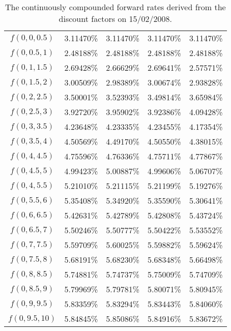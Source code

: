 \begin{landscape}
\begin{table}[ht]
\begin{center}
\begin{tabular}{c|c|c|c|c}
\toprule
$f(0,0,0.5)$ & 3.11470\% & 3.11470\% & 3.11470\% & 3.11470\% \\
$f(0,0.5,1)$ & 2.48188\% & 2.48188\% & 2.48188\% & 2.48188\% \\
$f(0,1,1.5)$ & 2.69428\% & 2.66629\% & 2.69641\% & 2.57571\% \\
$f(0,1.5,2)$ & 3.00509\% & 2.98389\% & 3.00674\% & 2.93828\% \\
$f(0,2,2.5)$ & 3.50001\% & 3.52393\% & 3.49814\% & 3.65984\% \\
$f(0,2.5,3)$ & 3.92720\% & 3.95902\% & 3.92386\% & 4.09428\% \\
$f(0,3,3.5)$ & 4.23648\% & 4.23335\% & 4.23455\% & 4.17354\% \\
$f(0,3.5,4)$ & 4.50569\% & 4.49170\% & 4.50550\% & 4.38015\% \\
$f(0,4,4.5)$ & 4.75596\% & 4.76336\% & 4.75711\% & 4.77867\% \\
$f(0,4.5,5)$ & 4.99423\% & 5.00887\% & 4.99606\% & 5.06707\% \\
$f(0,4,5.5)$ & 5.21010\% & 5.21115\% & 5.21199\% & 5.19276\% \\
$f(0,5.5,6)$ & 5.35408\% & 5.34920\% & 5.35590\% & 5.30641\% \\
$f(0,6,6.5)$ & 5.42631\% & 5.42789\% & 5.42808\% & 5.43724\% \\
$f(0,6.5,7)$ & 5.50246\% & 5.50777\% & 5.50422\% & 5.53552\% \\
$f(0,7,7.5)$ & 5.59709\% & 5.60025\% & 5.59882\% & 5.59624\% \\
$f(0,7.5,8)$ & 5.68191\% & 5.68230\% & 5.68348\% & 5.66498\% \\
$f(0,8,8.5)$ & 5.74881\% & 5.74737\% & 5.75009\% & 5.74709\% \\
$f(0,8.5,9)$ & 5.79969\% & 5.79781\% & 5.80071\% & 5.80945\% \\
$f(0,9,9.5)$ & 5.83359\% & 5.83294\% & 5.83443\% & 5.84060\% \\
$f(0,9.5,10)$ & 5.84845\% & 5.85086\% & 5.84916\% & 5.83672\% \\

\toprule

\end{tabular}
\end{center}
\caption[Forward Rates|15/02/2008]{The continuously compounded forward rates derived from the discount factors on 15/02/2008.}
\label{tab:fwdresults_1}
\end{table}

\end{landscape}

